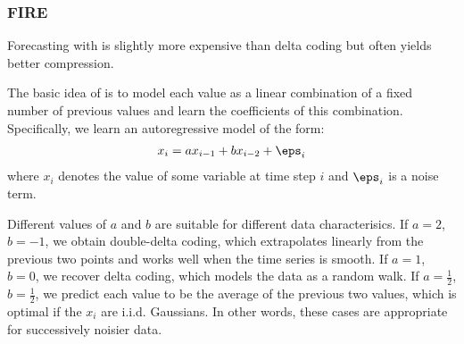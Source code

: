 \subsubsection{FIRE}

Forecasting with \fire is slightly more expensive than delta coding but often yields better compression. %


The basic idea of \fire is to model each value as a linear combination of a fixed number of previous values and learn the coefficients of this combination. Specifically, we learn an autoregressive model of the form:
\begin{align}
    x_i = a x_{i-1} + b x_{i-2} + \eps_i
\end{align}
where $x_i$ denotes the value of some variable at time step $i$ and $\eps_i$ is a noise term.

Different values of $a$ and $b$ are suitable for different data characterisics. If $a = 2$, $b = -1$, we obtain double-delta coding, which extrapolates linearly from the previous two points and works well when the time series is smooth. If $a = 1$, $b = 0$, we recover delta coding, which models the data as a random walk. If $a = \frac{1}{2}$, $b = \frac{1}{2}$, we predict each value to be the average of the previous two values, which is optimal if the $x_i$ are i.i.d. Gaussians. In other words, these cases are appropriate for successively noisier data.


